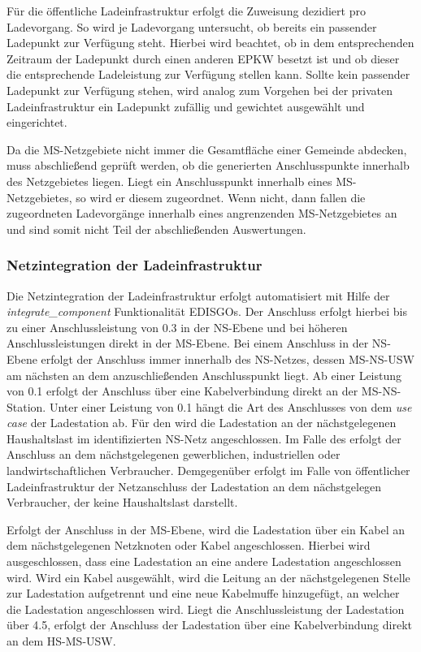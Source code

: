 Für die öffentliche Ladeinfrastruktur erfolgt die Zuweisung dezidiert pro Ladevorgang.
So wird je Ladevorgang untersucht, ob bereits ein passender Ladepunkt zur Verfügung steht.
Hierbei wird beachtet, ob in dem entsprechenden Zeitraum der Ladepunkt durch einen anderen \gls{EPKW} besetzt ist und ob dieser die entsprechende Ladeleistung zur Verfügung stellen kann.
Sollte kein passender Ladepunkt zur Verfügung stehen, wird analog zum Vorgehen bei der privaten Ladeinfrastruktur ein Ladepunkt zufällig und gewichtet ausgewählt und eingerichtet.\medskip

Da die \gls{MS}-Netzgebiete nicht immer die Gesamtfläche einer Gemeinde abdecken, muss abschließend geprüft werden, ob die generierten Anschlusspunkte innerhalb des Netzgebietes liegen.
Liegt ein Anschlusspunkt innerhalb eines \gls{MS}-Netzgebietes, so wird er diesem zugeordnet.
Wenn nicht, dann fallen die zugeordneten Ladevorgänge innerhalb eines angrenzenden \gls{MS}-Netzgebietes an und sind somit nicht Teil der abschließenden Auswertungen.


\subsubsection{Netzintegration der Ladeinfrastruktur}

Die Netzintegration der Ladeinfrastruktur erfolgt automatisiert mit Hilfe der \textit{integrate\_component} Funktionalität \glspl{EDISGO}.
Der Anschluss erfolgt hierbei bis zu einer Anschlussleistung von \SI{0.3}{\mva} in der \gls{NS}-Ebene und bei höheren Anschlussleistungen direkt in der \gls{MS}-Ebene.
Bei einem Anschluss in der \gls{NS}-Ebene erfolgt der Anschluss immer innerhalb des \gls{NS}-Netzes, dessen \gls{MS}-\gls{NS}-\gls{USW} am nächsten an dem anzuschließenden Anschlusspunkt liegt.
Ab einer Leistung von \SI{0.1}{\mva} erfolgt der Anschluss über eine Kabelverbindung direkt an der \gls{MS}-\gls{NS}-Station.
Unter einer Leistung von \SI{0.1}{\mva} hängt die Art des Anschlusses von dem \textit{use case} der Ladestation ab.
Für den \UC \zH wird die Ladestation an der nächstgelegenen Haushaltslast im identifizierten \gls{NS}-Netz angeschlossen.
Im Falle des \UC \Firmeparkplatz erfolgt der Anschluss an dem nächstgelegenen gewerblichen, industriellen oder landwirtschaftlichen Verbraucher.
Demgegenüber erfolgt im Falle von öffentlicher Ladeinfrastruktur der Netzanschluss der Ladestation an dem nächstgelegen Verbraucher, der keine Haushaltslast darstellt.\medskip

Erfolgt der Anschluss in der \gls{MS}-Ebene, wird die Ladestation über ein Kabel an dem nächstgelegenen Netzknoten oder Kabel angeschlossen.
Hierbei wird ausgeschlossen, dass eine Ladestation an eine andere Ladestation angeschlossen wird.
Wird ein Kabel ausgewählt, wird die Leitung an der nächstgelegenen Stelle zur Ladestation aufgetrennt und eine neue Kabelmuffe hinzugefügt, an welcher die Ladestation angeschlossen wird.
Liegt die Anschlussleistung der Ladestation über \SI{4.5}{\mva}, erfolgt der Anschluss der Ladestation über eine Kabelverbindung direkt an dem \gls{HS}-\gls{MS}-\gls{USW}.\medskip

